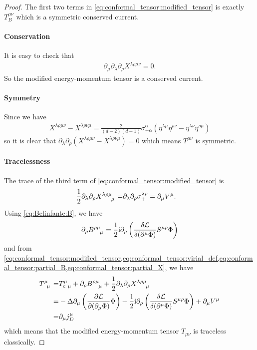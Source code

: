 \documentclass[10pt]{article}
\newcommand{\ii}{\mathrm{i}}
\begin{document}
\begin{proof}
    The first two terms in \cref{eq:conformal_tensor:modified_tensor} is exactly $T^{\mu\nu}_B$ which is a symmetric conserved current.
    \paragraph{Conservation}
    It is easy to check that
    \begin{align}
        \partial_\mu\partial_\lambda\partial_\rho X^{\lambda\rho\mu\nu}=0.
    \end{align}
    So the modified energy-momentum tensor is a conserved current.
    \paragraph{Symmetry}
    Since we have
    \begin{align}
        X^{\lambda\rho\mu\nu}-X^{\lambda\rho\nu\mu}=\frac{2}{(d-2)(d-1)}\sigma^\alpha_{+\alpha}\left(\eta^{\lambda\mu}\eta^{\rho\nu}-\eta^{\lambda\nu}\eta^{\rho\mu}\right)
    \end{align}
    so it is clear that $\partial_\lambda\partial_\rho\left(X^{\lambda\rho\mu\nu}-X^{\lambda\rho\nu\mu}\right)=0$ which means $T^{\mu\nu}$ is symmetric.
    \paragraph{Tracelessness}
    The trace of the third term of \cref{eq:conformal_tensor:modified_tensor} is
    \begin{align}
        \frac{1}{2} \partial_\lambda \partial_\rho \tensor{X}{^\lambda^\rho^\mu_\mu}= & \partial_\lambda \partial_\rho \sigma^{\lambda\rho}_+ =\partial_\mu V^\mu.\label{eq:conformal_tensor:partial_X}
    \end{align}
    Using \cref{eq:Belinfante:B}, we have
    \begin{align}
        \partial_\rho\tensor{B}{^\rho^\mu_\mu}=\frac{1}{2}\ii\partial_\rho\left(\fdv{\mathcal{L}}{(\partial^\mu\Phi)}S^{\mu\rho}\Phi\right)\label{eq:conformal_tensor:partial_B}
    \end{align}
    and from \cref{eq:conformal_tensor:modified_tensor,eq:conformal_tensor:virial_def,eq:conformal_tensor:partial_B,eq:conformal_tensor:partial_X}, we have\snm
    \begin{align}
        \tensor{T}{^\mu_\mu}= & T^{\mu}_{c\ \mu}+\partial_\rho\tensor{B}{^\rho^\mu_\mu}+\frac{1}{2}\partial_\lambda\partial_\rho\tensor{X}{^\lambda^\rho^\mu_\mu}\notag                                                         \\
        =                     & -\Delta\partial_\mu\left(\pdv{\mathcal{L}}{(\partial_\mu\Phi)}\Phi\right)+\frac{1}{2}\ii\partial_\rho\left(\fdv{\mathcal{L}}{(\partial^\mu\Phi)}S^{\mu\rho}\Phi\right)+\partial_\mu V^\mu\notag \\
        =                     & \partial_\mu j^\mu_D\label{eq:conformal_tensor:j_D}
    \end{align}
    which means that the modified energy-momentum tensor $T_{\mu\nu}$ is traceless classically.
\end{proof}
\end{document}
